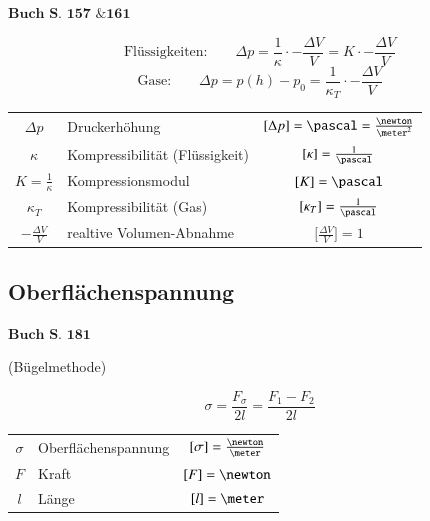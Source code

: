 \begin{flushright}
	$\boxed{\textbf{Buch S. 157 \& 161}}$
\end{flushright}

$$ \boxed{ \text{Flüssigkeiten:} \qquad \Delta p = \frac{1}{\kappa} \cdot - \frac{\Delta V}{V} = K \cdot - \frac{\Delta V}{V} } $$  
$$ \boxed{ \text{Gase:} \qquad \Delta p = p(h) - p_0 = \frac{1}{\kappa_T} \cdot - \frac{\Delta V}{V} } $$


\begin{tabular}{c l c}
	$\Delta p$              & Druckerhöhung                     & $[\Delta p] = \pascal = \frac{\newton}{\meter^2}$     \\
	$\kappa$                & Kompressibilität (Flüssigkeit)    & $[\kappa] = \frac{1}{\pascal}$                        \\
	$K = \frac{1}{\kappa}$  & Kompressionsmodul                 & $[K] = \pascal$                                       \\
	$\kappa_T$              & Kompressibilität (Gas)            & $[\kappa_T] = \frac{1}{\pascal}$                      \\
	$- \frac{\Delta V}{V}$  & realtive Volumen-Abnahme          & $\Big[ \frac{\Delta V}{V} \Big] = 1$ 
\end{tabular}


\subsection{Oberflächenspannung}
\begin{flushright}
	$\boxed{\textbf{Buch S. 181 }}$
\end{flushright}

(Bügelmethode) \\
\begin{minipage}[c]{0.3\columnwidth}
    $$ \boxed{ \sigma = \frac{F_\sigma}{2l} = \frac{F_1-F_2}{2l} } $$ 
\end{minipage}
\hfill
\begin{minipage}[c]{0.65\columnwidth}
    \renewcommand{\arraystretch}{1.3}
    \begin{tabular}{c l c}
    $\sigma$    & Oberflächenspannung   & $[\sigma] = \frac{\newton}{\meter}$   \\
    $F$         & Kraft                 & $[F] = \newton$                       \\
    $l$         & Länge                 & $[l] = \meter$
    \end{tabular}
    \renewcommand{\arraystretch}{1}
\end{minipage}


